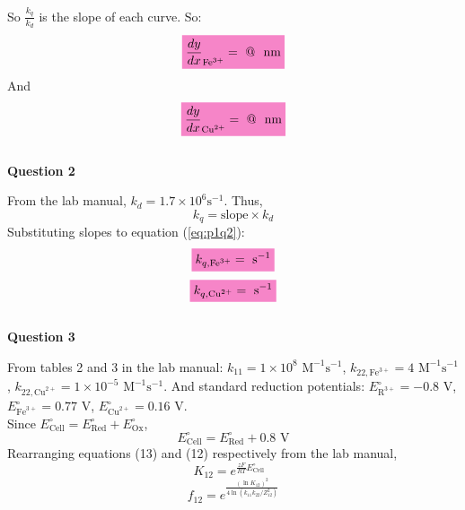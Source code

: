 So $\frac{k_q}{k_d}$ is the slope of each curve. So:
\begin{equation*}
    \mathcolorbox{Lavender}{\frac{dy}{dx}_{\text{Fe}^{3+}} =  \text{ @ }  \text{ nm} }
\end{equation*}
And
\begin{equation*}
    \mathcolorbox{Lavender}{\frac{dy}{dx}_{\text{Cu}^{2+}} =  \text{ @ }  \text{ nm} }
\end{equation*}
\\
\textbf{Question 2}
\par From the lab manual\autocite{lab_manual}, $k_d = 1.7 \times 10^6\text {s}^{-1}$. Thus,
\begin{equation}
    k_q = \text{slope} \times k_d
    \label{eq:p1q2}
\end{equation}
Substituting slopes to equation (\ref{eq:p1q2}):
\begin{equation*}
    \mathcolorbox{Lavender}{k_{q,\text{Fe}^{3+}} =  \text{ s}^{-1}}
\end{equation*}
\begin{equation*}
    \mathcolorbox{Lavender}{k_{q,\text{Cu}^{2+}} =  \text{ s}^{-1}}
\end{equation*}
\\
\textbf{Question 3}
\par From tables 2 and 3 in the lab manual\autocite{lab_manual}:
   $ k_{11} = 1 \times 10 ^ 8 \text{ M}^{-1}\text{s}^{-1}$, 
    $k_{22, \text{Fe}^{3+}} = 4 \text{ M}^{-1}\text{s}^{-1}$, 
    $k_{22, \text{Cu}^{2+}} = 1 \times 10 ^ {-5} \text{ M}^{-1}\text{s}^{-1}$. And standard reduction potentials: $E^{\circ}_{\text{R}^{3+}} = -0.8 \text{ V}$, $E^{\circ}_{\text{Fe}^{3+}} = 0.77 \text{ V}$, $E^{\circ}_{\text{Cu}^{2+}} = 0.16 \text{ V}$.
\\ Since $E^{\circ}_{\text{Cell}} = E^{\circ}_{\text{Red}} + E^{\circ}_{\text{Ox}}$, 
\begin{equation}
    E^{\circ}_{\text{Cell}} = E^{\circ}_{\text{Red}} + 0.8 \text{ V}
    \label{eq:ecell}
\end{equation}
Rearranging equations (13) and (12) respectively from the lab manual\autocite{lab_manual},
\begin{equation}
    K_{12} = e^{\frac{zF}{RT}E^{\circ}_{\text{Cell}}} \text{ } 
    \label{eq:K12}
\end{equation}
\begin{equation}
    f_{12} = e^{\frac{(\ln{K_{12}})^2}{4\ln{(k_{11}k_{22} / Z_{12}^2)}}}
    \label{eq:f12}
\end{equation}
